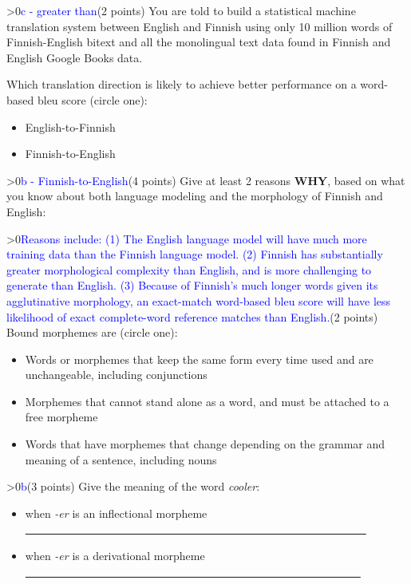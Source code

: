 \documentclass[12pt]{article}
\newcounter{showsolution}
\newcommand{\solution}[2]{\ifnum\value{showsolution}>0{\textcolor{blue}{#1}}\else{#2}\fi}
\begin{document}
\begin{itemize}
\solution{c - greater than}

\item[4.] (2 points) You are told to build a statistical machine translation system between English and Finnish using
only 10 million words of Finnish-English bitext and all the monolingual text data found in
Finnish and English Google Books data.

Which translation direction is likely to achieve better performance on a word-based bleu score (circle one):

\begin{itemize}
 \item[(a)] English-to-Finnish
 \item[(b)] Finnish-to-English
\end{itemize}

\solution{b - Finnish-to-English}

\item[5.] (4 points) Give at least 2 reasons {\bf WHY}, based on what you know about both language
modeling and the morphology of Finnish and English:

\solution{Reasons include: (1) The English language model will have much more training data than
the Finnish language model. (2) Finnish has substantially greater morphological complexity than English,
and is more challenging to generate than English. (3) Because of Finnish's much longer words given
its agglutinative morphology, an exact-match word-based bleu score will have less likelihood of exact complete-word 
reference matches
than English.}


\item[6.] (2 points) Bound morphemes are (circle one):

\begin{itemize}
\item[(a)] Words or morphemes that keep the same form every time used and are unchangeable, including conjunctions
\item[(b)] Morphemes that cannot stand alone as a word, and must be attached to a free morpheme
\item[(c)] Words that have morphemes that change depending on the grammar and meaning of a sentence, including nouns
\end{itemize}

\solution{b}


\item[7.] (3 points) Give the meaning of the word {\it cooler}:
\begin{itemize}
  \item[(a)] when {\it -er} is an inflectional morpheme  
    \underline{\ \ \ \ \ \ \ \ \ \ \ \ \ \ \ \ \ \ \ \ \ \ \ \ \ \ \ \ \ \ \ \  \ \ \ \ \ \ \ \ \ \ \ \ \ \ \ \ \ \ \ \ \ \ \ \ \ \ \ \ \ }
  \item[(b)] when {\it -er} is a derivational morpheme 
     \underline {
     \ \ \ \ \ \ \ \ \ \ \ \ \ \ \ \ \ \ \ \ \ \ \ \ \ \ \ \ \ \ \ \  \ \ \ \ \ \ \ \ \ \ \ \ \ \ \ \ \ \ \ \ \ \ \ \ \ \ \ \ }
\end{itemize}


\end{itemize}
\end{document}
